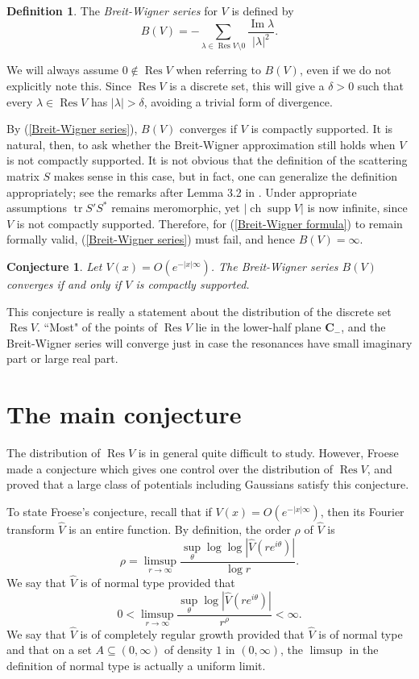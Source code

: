 \documentclass[12pt]{report}
\newcommand{\CC}{\mathbf{C}}
\DeclareMathOperator{\ch}{ch}
\DeclareMathOperator{\Res}{Res}
\DeclareMathOperator{\supp}{supp}
\newcommand{\tr}{\operatorname{tr}}
\newcommand{\dfn}[1]{\emph{#1}\index{#1}}
\renewcommand{\Im}{\operatorname{Im}}
\newtheorem{conjecture}[theorem]{Conjecture}
\theoremstyle{definition}
\newtheorem{definition}[theorem]{Definition}
\begin{document}
\begin{definition}
The \dfn{Breit-Wigner series} for $V$ is defined by
$$B(V) = -\sum_{\lambda \in \Res V \setminus 0} \frac{\Im \lambda}{|\lambda|^2}.$$
\end{definition}
We will always assume $0 \notin \Res V$ when referring to $B(V)$, even if we do not explicitly note this.
Since $\Res V$ is a discrete set, this will give a $\delta > 0$ such that every $\lambda \in \Res V$ has $|\lambda| > \delta$, avoiding a trivial form of divergence.

By (\ref{Breit-Wigner series}), $B(V)$ converges if $V$ is compactly supported.
It is natural, then, to ask whether the Breit-Wigner approximation still holds when $V$ is not compactly supported. It is not obvious that the definition of the scattering matrix $S$ makes sense in this case, but in fact, one can generalize the definition appropriately; see the remarks after Lemma 3.2 in \cite{froese1997asymptotic}.
Under appropriate assumptions $\tr S'S^*$ remains meromorphic, yet $|\ch\supp V|$ is now infinite, since $V$ is not compactly supported. Therefore, for (\ref{Breit-Wigner formula}) to remain formally valid, (\ref{Breit-Wigner series}) must fail, and hence $B(V) = \infty$.
\begin{conjecture}
\label{strong conjecture}
Let $V(x) = O(e^{-|x|\infty})$. The Breit-Wigner series $B(V)$ converges if and only if $V$ is compactly supported.
\end{conjecture}

This conjecture is really a statement about the distribution of the discrete set $\Res V$.
``Most" of the points of $\Res V$ lie in the lower-half plane $\CC_-$, and the Breit-Wigner series will converge just in case the resonances have small imaginary part or large real part.

\section{The main conjecture}
The distribution of $\Res V$ is in general quite difficult to study.
However, Froese made a conjecture \cite[Conjecture 1.2]{froese1997asymptotic} which gives one control over the distribution of $\Res V$, and proved that a large class of potentials including Gaussians satisfy this conjecture.

To state Froese's conjecture, recall that if $V(x) = O(e^{-|x|\infty})$, then its Fourier transform $\hat V$ is an entire function.
By definition, the order $\rho$ of $\hat V$ is
\begin{equation}
\label{order of Vhat}
\rho = \limsup_{r \to \infty} \frac{\sup_\theta \log \log |\hat V(re^{i\theta})|}{\log r}.
\end{equation}
We say that $\hat V$ is of normal type provided that
$$0 < \limsup_{r \to \infty} \frac{\sup_\theta \log|\hat V(re^{i\theta})|}{r^\rho} < \infty.$$
We say that $\hat V$ is of completely regular growth provided that $\hat V$ is of normal type and that on a set $A \subseteq (0, \infty)$ of density $1$ in $(0, \infty)$, the $\limsup$ in the definition of normal type is actually a uniform limit.
\end{document}
